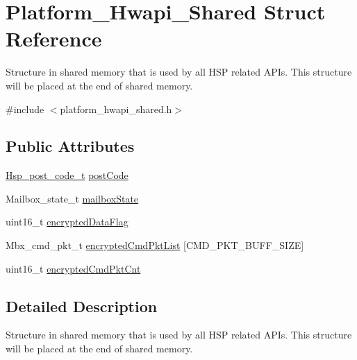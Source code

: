 \hypertarget{structPlatform__Hwapi__Shared}{\section{Platform\-\_\-\-Hwapi\-\_\-\-Shared Struct Reference}
\label{structPlatform__Hwapi__Shared}
}


Structure in shared memory that is used by all H\-S\-P related A\-P\-Is. This structure will be placed at the end of shared memory.  




{\ttfamily \#include $<$platform\-\_\-hwapi\-\_\-shared.\-h$>$}

\subsection*{Public Attributes}
\begin{DoxyCompactItemize}
\item 
\hyperlink{platform__postcodes_8h_ad8835cc61ade0f8b65b4b697830a935a}{Hsp\-\_\-post\-\_\-code\-\_\-t} \hyperlink{structPlatform__Hwapi__Shared_abfa2753a9aaed30223495bbb60729824}{post\-Code}
\item 
Mailbox\-\_\-state\-\_\-t \hyperlink{structPlatform__Hwapi__Shared_a3fc3d581f0eda3d5a05842fd09fbb365}{mailbox\-State}
\item 
uint16\-\_\-t \hyperlink{structPlatform__Hwapi__Shared_a7bcb04a0f8ea2b7245505bcbf0f2be43}{encrypted\-Data\-Flag}
\item 
Mbx\-\_\-cmd\-\_\-pkt\-\_\-t \hyperlink{structPlatform__Hwapi__Shared_a7b45e4666a52bb69f129b5be524b7a3f}{encrypted\-Cmd\-Pkt\-List} \mbox{[}C\-M\-D\-\_\-\-P\-K\-T\-\_\-\-B\-U\-F\-F\-\_\-\-S\-I\-Z\-E\mbox{]}
\item 
uint16\-\_\-t \hyperlink{structPlatform__Hwapi__Shared_aad57f2ce10ee9e9c2d85546430b79836}{encrypted\-Cmd\-Pkt\-Cnt}
\end{DoxyCompactItemize}


\subsection{Detailed Description}
Structure in shared memory that is used by all H\-S\-P related A\-P\-Is. This structure will be placed at the end of shared memory. 

